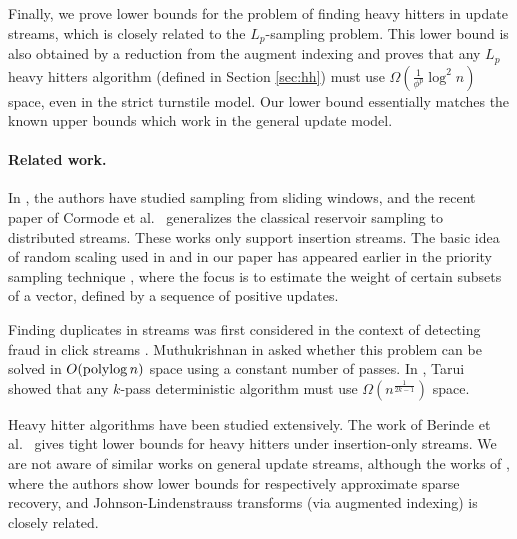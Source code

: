 
Finally, we prove lower bounds for the problem of finding heavy
hitters in update streams, which is closely related to the
$L_p$-sampling problem. This lower bound is also obtained by a
reduction from the augment indexing and proves that any $L_p$
heavy hitters algorithm (defined in Section \ref{sec:hh}) must
use $\Omega(\frac{1}{\phi^p}\log^2 n)$ space, even in the strict
turnstile model. Our lower bound essentially matches the known
upper bounds \cite{CormodeM2005b,CharikarCF2004,KaneNPW2010}
which work in the general update model.

\paragraph{Related work.}
In \cite{BabcockDM2002, BravermanOZ2009}, the authors have
studied sampling from sliding windows, and the recent paper of
Cormode et al.\ \cite{CormodeMYZ2010} generalizes the classical
reservoir sampling to distributed streams. These works only
support insertion streams. The basic idea of random scaling used
in \cite{AndoniKO2010} and in our paper has appeared earlier in
the priority sampling technique
\cite{DuffieldLT2007,CohenDKLT2009}, where the focus is to
estimate the weight of certain subsets of a vector, defined by a
sequence of positive updates.
 
Finding duplicates in streams was first considered in the
context of detecting fraud in click streams
\cite{MetwallyAA2005}. Muthukrishnan in \cite{Muthukrishnan2005}
asked whether this problem can be solved in $O(\operatorname{polylog} n)$
space using a constant number of passes. In \cite{Tarui2007},
Tarui showed that any $k$-pass deterministic algorithm must use
$\Omega(n^{\frac1{2k-1}})$ space.
 
Heavy hitter algorithms have been studied extensively. The work
of Berinde et al.\ \cite{BerindeCIS2009} gives tight lower
bounds for heavy hitters under insertion-only streams. We are
not aware of similar works on general update streams, although
the works of \cite{BaIPW2010, WoodruffJ2011}, where the authors
show lower bounds for respectively approximate sparse recovery,
and Johnson-Lindenstrauss transforms (via augmented indexing) is
closely related.

